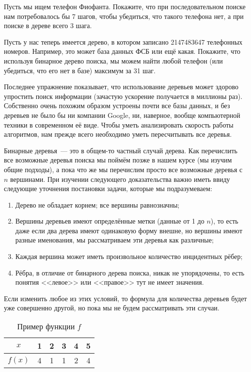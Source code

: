 \begin{exercise}
Пусть мы ищем телефон Фиофанта. Покажите, что при последовательном поиске нам потребовалось бы 7 шагов, чтобы убедиться, что такого телефона нет, а при поиске  в дереве всего 3 шага.
\end{exercise}

\begin{exercise}
Пусть у нас теперь имеется дерево, в котором записано 2147483647 телефонных номеров. Например, это может база данных ФСБ или ещё какая. Покажите, что используя бинарное дерево поиска, мы можем найти любой телефон (или убедиться, что его нет в базе) максимум за 31 шаг.
\end{exercise}

Последнее упражнение показывает, что использование деревьев может здорово упростить поиск информации (зачастую ускорение получается в миллионы раз). Собственно очень похожим образом устроены почти все базы данных, и без деревьев не было бы ни компании Google, ни, наверное, вообще компьютерной техники в современном её виде. Чтобы уметь анализировать скорость работы алгоритмов, нам прежде всего необходимо уметь пересчитывать все деревья.

Бинарные деревья~--- это в общем-то частный случай дерева. Как перечислить все возможные деревья поиска мы поймём позже в нашем курсе (мы изучим общие подходы), а пока что же мы перечислим  просто все возможные деревья с $n$ вершинами. При изучении следующего доказательства важно иметь ввиду следующие уточнения постановки задачи, которые мы подразумеваем:
\begin{enumerate}
\item Дерево не обладает корнем; все вершины равнозначны;
\item Вершины деревьев имеют определённые метки (данные от 1 до $n$), то есть даже если два дерева имеют одинаковую форму внешне, но вершины имеют разные именования, мы рассматриваем эти деревья как различные;
\item Каждая вершина может иметь произвольное количество инцидентных рёбер;
\item Рёбра, в отличие от бинарного дерева поиска, никак не упорядочены, то есть понятия <<левое>> или <<правое>> тут не имеет значения.
\end{enumerate}

Если изменить любое из этих условий, то формула для количества деревьев будет уже совершенно другой, но пока мы не будем рассматривать эти случаи.

\begin{table}[h]
\centering
\begin{tabular}{c|ccccc}
$x$ & 1 & 2 & 3 & 4 & 5 \\
\hline
$f(x)$ & 4 & 1 & 1 & 2 & 4
\end{tabular}
\caption{Пример функции $f$}
\end{table}

